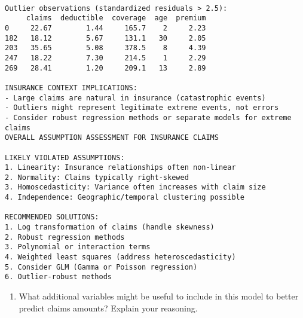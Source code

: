 \documentclass[8pt, twocolumn]{extarticle}
\providecommand{\tightlist}{%
      \setlength{\itemsep}{0pt}\setlength{\parskip}{0pt}}
\begin{document}
    \begin{Verbatim}[commandchars=\\\{\}]

Outlier observations (standardized residuals > 2.5):
     claims  deductible  coverage  age  premium
0     22.67        1.44     165.7    2     2.23
182   18.12        5.67     131.1   30     2.05
203   35.65        5.08     378.5    8     4.39
247   18.22        7.30     214.5    1     2.29
269   28.41        1.20     209.1   13     2.89

INSURANCE CONTEXT IMPLICATIONS:
- Large claims are natural in insurance (catastrophic events)
- Outliers might represent legitimate extreme events, not errors
- Consider robust regression methods or separate models for extreme claims
OVERALL ASSUMPTION ASSESSMENT FOR INSURANCE CLAIMS

LIKELY VIOLATED ASSUMPTIONS:
1. Linearity: Insurance relationships often non-linear
2. Normality: Claims typically right-skewed
3. Homoscedasticity: Variance often increases with claim size
4. Independence: Geographic/temporal clustering possible

RECOMMENDED SOLUTIONS:
1. Log transformation of claims (handle skewness)
2. Robust regression methods
3. Polynomial or interaction terms
4. Weighted least squares (address heteroscedasticity)
5. Consider GLM (Gamma or Poisson regression)
6. Outlier-robust methods

    \end{Verbatim}

    \begin{enumerate}
\def\labelenumi{(\alph{enumi})}
\setcounter{enumi}{1}
\tightlist
\item
  What additional variables might be useful to include in this model to
  better predict claims amounts? Explain your reasoning.
\end{enumerate}
\end{document}
